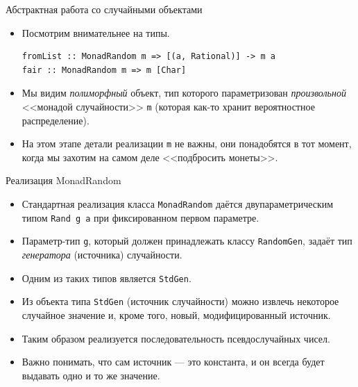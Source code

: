 \documentclass[xcolor=dvipsnames]{beamer}
\begin{document}
\begin{frame}[fragile]{Абстрактная работа со случайными объектами}
 
 \begin{itemize}[<+->]
  \item Посмотрим внимательнее на типы.
\begin{verbatim}
fromList :: MonadRandom m => [(a, Rational)] -> m a
fair :: MonadRandom m => m [Char] 
\end{verbatim}
  \item Мы видим {\em полиморфный} объект, тип которого параметризован {\em произвольной} <<монадой случайности>> {\tt m} (которая как-то хранит вероятностное распределение).
  \item На этом этапе детали реализации {\tt m} не важны, они понадобятся в тот момент, когда мы захотим на самом деле <<подбросить монеты>>.

 \end{itemize}

 
\end{frame}


\begin{frame}{Реализация MonadRandom}
 \begin{itemize}[<+->]
  \item Стандартная реализация класса \texttt{MonadRandom} даётся двупараметрическим типом \texttt{Rand g a} при фиксированном первом параметре.
  \item Параметр-тип {\tt g}, который должен принадлежать классу \texttt{RandomGen}, задаёт тип {\em генератора} (источника) случайности.
  \item Одним из таких типов является \texttt{StdGen}.
  \item Из объекта типа \texttt{StdGen} (источник случайности) можно извлечь некоторое случайное значение и, кроме того, новый, модифицированный источник.
  \item Таким образом реализуется последовательность псевдослучайных чисел.
  \item Важно понимать, что сам источник --- это константа, и он всегда будет выдавать одно и то же значение.
 \end{itemize}

 
\end{frame}
\end{document}
